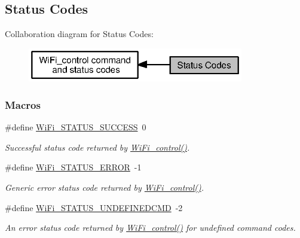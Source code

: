 \subsection{Status Codes}
\label{group___wi_fi___s_t_a_t_u_s}
Collaboration diagram for Status Codes\+:
\nopagebreak
\begin{figure}[H]
\begin{center}
\leavevmode
\includegraphics[width=267pt]{group___wi_fi___s_t_a_t_u_s}
\end{center}
\end{figure}
\subsubsection*{Macros}
\begin{DoxyCompactItemize}
\item 
\#define \hyperlink{group___wi_fi___s_t_a_t_u_s_ga02c176082ea8f3c0a258564269dffe71}{Wi\+Fi\+\_\+\+S\+T\+A\+T\+U\+S\+\_\+\+S\+U\+C\+C\+E\+S\+S}~0
\begin{DoxyCompactList}\small\item\em Successful status code returned by \hyperlink{_wi_fi_8h_a1f42a1e174ed1682b7de43ec6f043bf7}{Wi\+Fi\+\_\+control()}. \end{DoxyCompactList}\item 
\#define \hyperlink{group___wi_fi___s_t_a_t_u_s_ga3ad6de679b76f24a0fb86eb3299253ad}{Wi\+Fi\+\_\+\+S\+T\+A\+T\+U\+S\+\_\+\+E\+R\+R\+O\+R}~-\/1
\begin{DoxyCompactList}\small\item\em Generic error status code returned by \hyperlink{_wi_fi_8h_a1f42a1e174ed1682b7de43ec6f043bf7}{Wi\+Fi\+\_\+control()}. \end{DoxyCompactList}\item 
\#define \hyperlink{group___wi_fi___s_t_a_t_u_s_gac838b848572d4fdc52755592d2372f67}{Wi\+Fi\+\_\+\+S\+T\+A\+T\+U\+S\+\_\+\+U\+N\+D\+E\+F\+I\+N\+E\+D\+C\+M\+D}~-\/2
\begin{DoxyCompactList}\small\item\em An error status code returned by \hyperlink{_wi_fi_8h_a1f42a1e174ed1682b7de43ec6f043bf7}{Wi\+Fi\+\_\+control()} for undefined command codes. \end{DoxyCompactList}\end{DoxyCompactItemize}


